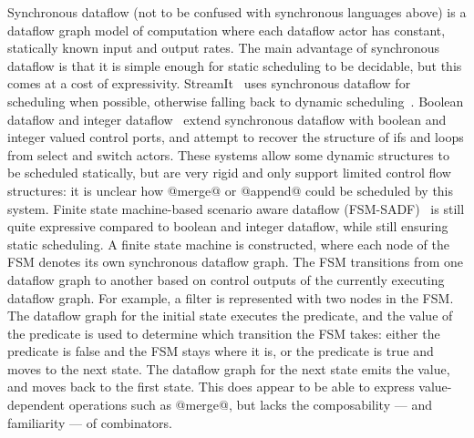 Synchronous dataflow (not to be confused with synchronous languages above) is a dataflow graph model of computation where each dataflow actor has constant, statically known input and output rates.
The main advantage of synchronous dataflow is that it is simple enough for static scheduling to be decidable, but this comes at a cost of expressivity.
StreamIt~\cite{thies2002streamit} uses synchronous dataflow for scheduling when possible, otherwise falling back to dynamic scheduling~\cite{soule2013dynamic}.
Boolean dataflow and integer dataflow~\cite{buck1993scheduling,buck1994static} extend synchronous dataflow with boolean and integer valued control ports, and attempt to recover the structure of ifs and loops from select and switch actors.
These systems allow some dynamic structures to be scheduled statically, but are very rigid and only support limited control flow structures: it is unclear how @merge@ or @append@ could be scheduled by this system.
Finite state machine-based scenario aware dataflow (FSM-SADF)~\cite{stuijk2011scenario,van2015scenario} is still quite expressive compared to boolean and integer dataflow, while still ensuring static scheduling.
A finite state machine is constructed, where each node of the FSM denotes its own synchronous dataflow graph.
The FSM transitions from one dataflow graph to another based on control outputs of the currently executing dataflow graph.
For example, a filter is represented with two nodes in the FSM.
The dataflow graph for the initial state executes the predicate, and the value of the predicate is used to determine which transition the FSM takes: either the predicate is false and the FSM stays where it is, or the predicate is true and moves to the next state.
The dataflow graph for the next state emits the value, and moves back to the first state.
This does appear to be able to express value-dependent operations such as @merge@, but lacks the composability --- and familiarity --- of combinators.

% 


